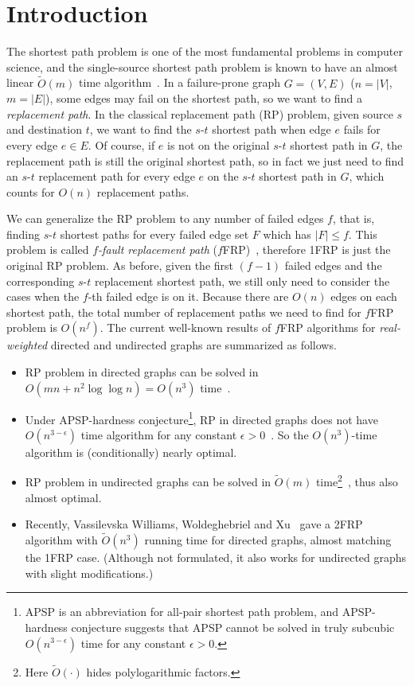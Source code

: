 \documentclass[11pt]{article}
\theoremstyle{plain}
\theoremstyle{definition}
\begin{document}
\thispagestyle{empty}
\setcounter{page}{1}
\pagestyle{plain}

\section{Introduction}



The shortest path problem is one of the most fundamental problems in computer science, and the single-source shortest path problem is known to have an almost linear $\tilde{O}(m)$ time algorithm~\cite{Dij59,DMSY23}. In a failure-prone graph $G=(V,E)$ ($n=|V|$, $m=|E|$), some edges may fail on the shortest path, so we want to find a \emph{replacement path}. In the classical replacement path (RP) problem, given source $s$ and destination $t$, we want to find the $s$-$t$ shortest path when edge $e$ fails for every edge $e\in E$. Of course, if $e$ is not on the original $s$-$t$ shortest path in $G$, the replacement path is still the original shortest path, so in fact we just need to find an $s$-$t$ replacement path for every edge $e$ on the $s$-$t$ shortest path in $G$, which counts for $O(n)$ replacement paths.

We can generalize the RP problem to any number of failed edges $f$, that is, finding $s$-$t$ shortest paths for every failed edge set $F$ which has $|F|\leq f$. This problem is called \emph{$f$-fault replacement path} ($f$FRP)~\cite{WWX22}, therefore 1FRP is just the original RP problem. As before, given the first $(f-1)$ failed edges and the corresponding $s$-$t$ replacement shortest path, we still only need to consider the cases when the $f$-th failed edge is on it. Because there are $O(n)$ edges on each shortest path, the total number of replacement paths we need to find for $f$FRP problem is $O(n^f)$. The current well-known results of $f$FRP algorithms for \emph{real-weighted} directed and undirected graphs are summarized as follows.

\begin{itemize}
    \item RP problem in directed graphs can be solved in $O(mn+n^2\log\log n)=O(n^3)$ time~\cite{GL09}.
    \item Under APSP-hardness conjecture\footnote{APSP is an abbreviation for all-pair shortest path problem, and APSP-hardness conjecture suggests that APSP cannot be solved in truly subcubic $O(n^{3-\epsilon})$ time for any constant $\epsilon>0$.}, RP in directed graphs does not have $O(n^{3-\epsilon})$ time algorithm for any constant $\epsilon>0$~\cite{WW18}. So the $O(n^3)$-time algorithm is (conditionally) nearly optimal.
    \item RP problem in undirected graphs can be solved in $\tilde{O}(m)$ time\footnote{Here $\tilde{O}(\cdot)$ hides polylogarithmic factors.}~\cite{NPW01}, thus also almost optimal.
    \item Recently, Vassilevska Williams, Woldeghebriel and Xu~\cite{WWX22} gave a 2FRP algorithm with $\tilde{O}(n^3)$ running time for directed graphs, almost matching the 1FRP case. (Although not formulated, it also works for undirected graphs with slight modifications.)
\end{itemize}
\end{document}
